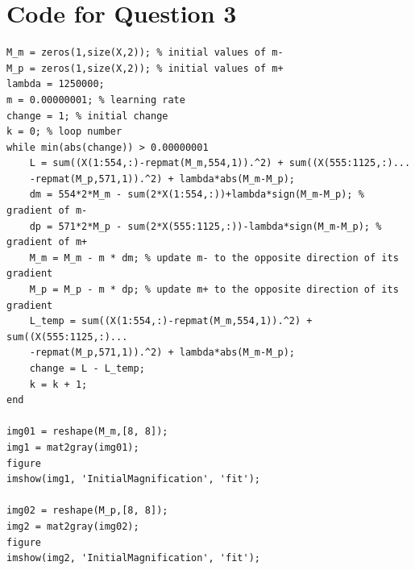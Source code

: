 \documentclass[a4paper]{scrartcl}
\begin{document}
\clearpage

\section{Code for Question 3}
\label{app: c}
\begin{lstlisting}
M_m = zeros(1,size(X,2)); % initial values of m-
M_p = zeros(1,size(X,2)); % initial values of m+
lambda = 1250000;
m = 0.00000001; % learning rate
change = 1; % initial change
k = 0; % loop number
while min(abs(change)) > 0.00000001
    L = sum((X(1:554,:)-repmat(M_m,554,1)).^2) + sum((X(555:1125,:)...
    -repmat(M_p,571,1)).^2) + lambda*abs(M_m-M_p);
    dm = 554*2*M_m - sum(2*X(1:554,:))+lambda*sign(M_m-M_p); % gradient of m-
    dp = 571*2*M_p - sum(2*X(555:1125,:))-lambda*sign(M_m-M_p); % gradient of m+
    M_m = M_m - m * dm; % update m- to the opposite direction of its gradient
    M_p = M_p - m * dp; % update m+ to the opposite direction of its gradient
    L_temp = sum((X(1:554,:)-repmat(M_m,554,1)).^2) + sum((X(555:1125,:)...
    -repmat(M_p,571,1)).^2) + lambda*abs(M_m-M_p);
    change = L - L_temp;
    k = k + 1;
end

img01 = reshape(M_m,[8, 8]);
img1 = mat2gray(img01);
figure
imshow(img1, 'InitialMagnification', 'fit');
 
img02 = reshape(M_p,[8, 8]);
img2 = mat2gray(img02);
figure
imshow(img2, 'InitialMagnification', 'fit');
\end{lstlisting}
\end{document}
